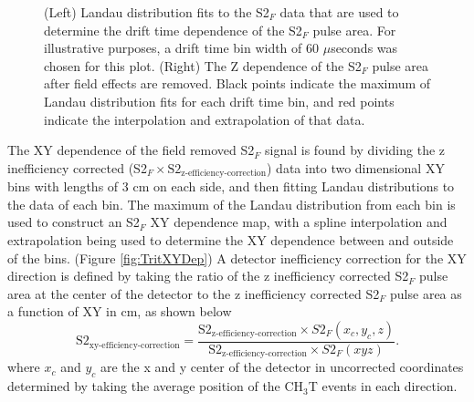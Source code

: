 \documentclass[a4paper,12pt]{article}
\begin{document}
{\begin{figure} 
\centering
{}
\qquad
{}
\caption{ (Left) Landau distribution fits to the S2$_F$ data that are used to determine the drift time dependence of the S2$_F$ pulse area. For illustrative purposes, a drift time bin width of 60 $\mu$seconds was chosen for this plot. (Right) The Z dependence of the S2$_F$ pulse area after field effects are removed.  Black points indicate the maximum of Landau distribution fits for each drift time bin, and red points indicate the interpolation and extrapolation of that data.}
\label{fig:LandauPlot}
\end{figure}

The XY dependence of the field removed S2$_F$ signal is found by dividing the z inefficiency corrected (S2$_F \times \mbox{S}2_{\mbox{z-efficiency-correction}}$) data into two dimensional XY bins with lengths of 3 cm on each side, and then fitting Landau distributions to the data of each bin.  The maximum of the Landau distribution from each bin is used to construct an S2$_F$ XY dependence map, with a spline interpolation and extrapolation being used to determine the XY dependence between and outside of the bins. (Figure \ref{fig:TritXYDep}) A detector inefficiency correction for the XY direction is defined by taking the ratio of the z inefficiency corrected S2$_F$ pulse area at the center of the detector to the z inefficiency corrected S2$_F$ pulse area as a function of XY in cm, as shown below
\begin{equation}
\mbox{S}2_{\mbox{xy-efficiency-correction}} = \frac{\mbox{S}2_{\mbox{z-efficiency-correction}}\times S2_F(x_c,y_c,z)}{\mbox{S}2_{\mbox{z-efficiency-correction}}\times S2_F(xyz)}.
\end{equation} 
where $x_c$ and $y_c$ are the x and y center of the detector in uncorrected coordinates determined by taking the average position of the CH$_3$T events in each direction.

}
\end{document}
